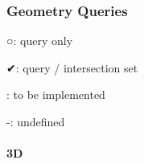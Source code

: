\subsubsection*{Geometry Queries}


\begin{DoxyItemize}
\item {\ttfamily ○}\+: query only
\item {\ttfamily ✔}\+: query / intersection set
\item \+: to be implemented
\item {\ttfamily -\/}\+: undefined
\end{DoxyItemize}

\paragraph*{3D}

